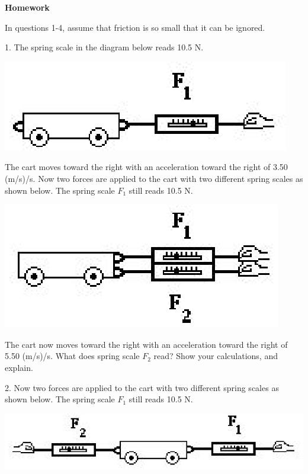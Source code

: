 \textbf{Homework}

In questions 1-4, assume that friction is so small that it can be ignored.

1. The spring scale in the diagram below reads 10.5 N.

\vspace{0.3cm}
{\par\centering \includegraphics{combining/combining_fig2.eps} \par}
\vspace{0.3cm}

The cart moves toward the right with an acceleration toward the right of 3.50
(m/s)/s. Now two forces are applied to the cart with two different spring scales
as shown below. The spring scale \( F_{1} \) still reads 10.5 N.

\vspace{0.3cm}
{\par\centering \includegraphics{combining/combining_fig3.eps} \par}
\vspace{0.3cm}

The cart now moves toward the right with an acceleration toward the right of
5.50 (m/s)/s. What does spring scale \( F_{2} \) read? Show your calculations,
and explain.
\answerspace{20mm}

2. Now two forces are applied to the cart with two different spring scales as
shown below. The spring scale \( F_{1} \) still reads 10.5 N.

\vspace{0.3cm}
{\par\centering \includegraphics{combining/combining_fig4.eps} \par}
\vspace{0.3cm}

